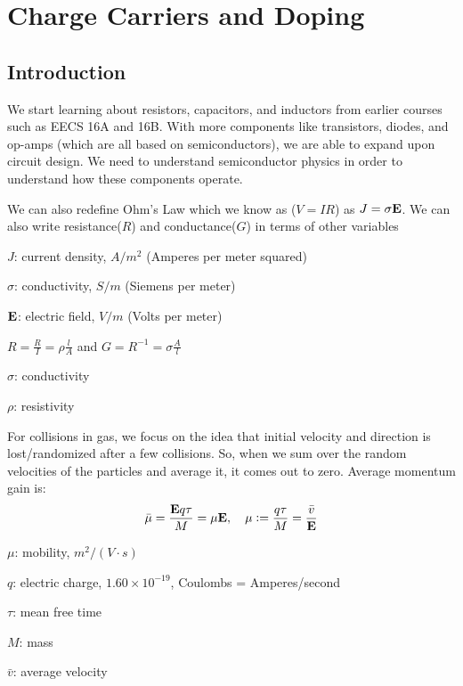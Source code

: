 \section{Charge Carriers and Doping}

\subsection{Introduction}
We start learning about resistors, capacitors, and inductors from earlier courses such as EECS 16A and 16B. With more components like transistors, diodes, and op-amps (which are all based on semiconductors), we are able to expand upon circuit design. We need to understand semiconductor physics in order to understand how these components operate.
\begin{center}
\end{center}

We can also redefine Ohm's Law which we know as ($V = IR$) as $J = \sigma \vb{E}$. We can also write resistance($R$) and conductance($G$) in terms of other variables
\begin{gline}
    \item $J$: current density, $A/m^2$ (Amperes per meter squared)
    \item $\sigma$: conductivity, $S/m$ (Siemens per meter)
    \item $\vb{E}$: electric field, $V/m$ (Volts per meter)
\end{gline}

$R = \frac{R}{I} = \rho \frac{l}{A}$ and $G = R^{-1} = \sigma \frac{A}{l}$
\begin{gline}
    \item $\sigma$: conductivity
    \item $\rho$: resistivity
\end{gline}

For collisions in gas, we focus on the idea that initial velocity and direction is lost/randomized after a few collisions. So, when we sum over the random velocities of the particles and average it, it comes out to zero. Average momentum gain is:
\[\bar{\mu} = \frac{\vb{E} q \tau}{M} = \mu \vb{E}, ~~~ \mu := \frac{q \tau}{M} = \frac{\bar{v}}{\vb{E}}\]
\begin{gline}
    \item $\mu$: mobility, $m^2/ (V \cdot s)$
    \item $q$: electric charge, $1.60 \times 10^{-19}$, Coulombs = Amperes/second
    \item $\tau$: mean free time
    \item $M$: mass
    \item $\bar{v}$: average velocity
\end{gline}

